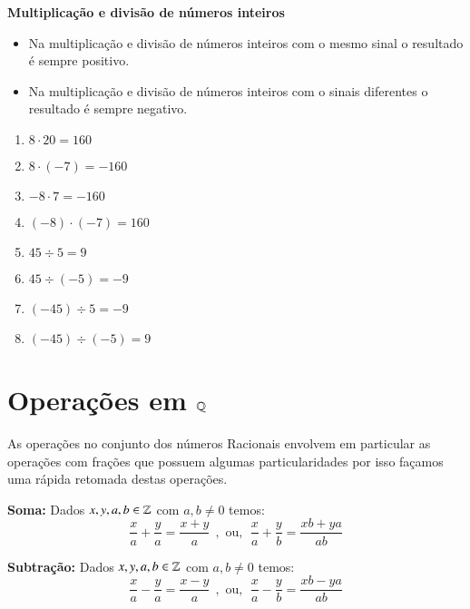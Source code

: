  \textbf{Multiplicação e divisão de números inteiros}
 
  \begin{itemize}
   \item Na multiplicação e divisão de números inteiros com o mesmo sinal o resultado é sempre positivo.
   \item Na multiplicação e divisão de números inteiros com o sinais diferentes o resultado é sempre negativo.
  \end{itemize}

  \begin{multicols}{2}
  \begin{enumerate}[1)]
   \item $8 \cdot 20= 160$
   \item $8 \cdot (-7)= -160$
   \item $-8 \cdot 7= -160$
   \item $(-8) \cdot (-7)= 160$
   \item $45 \div 5= 9$
   \item $45 \div (-5)= -9$
   \item $(-45) \div 5= -9$
   \item $(-45) \div (-5)= 9$
  \end{enumerate}
  \end{multicols}


 
 \section{Operações em \texorpdfstring{$\mathbb{Q}$}{Q}}
 
 As operações no conjunto dos números Racionais envolvem em particular as operações com frações que possuem algumas particularidades por isso façamos uma rápida retomada destas operações.
 
 \vskip0.3cm
 
 \colorbox{azul}{
 \begin{minipage}{14.5cm}
 \begin{center}
  \textbf{Soma:} Dados $x, y, a, b \in \mathbb{Z}$ com $a, b \neq 0$ temos:
 \[\frac{x}{a} + \frac{y}{a}= \frac{x+y}{a} \ \ , \text{ ou}, \ \ 
  \frac{x}{a} + \frac{y}{b}= \frac{xb + ya}{ab} \]
 \end{center}
 \end{minipage}}
 
 \vskip0.3cm
  
 \colorbox{azul}{
 \begin{minipage}{14.5cm}
 \begin{center}
  \textbf{Subtração:} Dados $x, y, a, b \in \mathbb{Z}$ com $a, b \neq 0$ temos:
 \[\frac{x}{a} - \frac{y}{a}= \frac{x-y}{a} \ \ , \text{ ou}, \ \
 \frac{x}{a} - \frac{y}{b}= \frac{xb - ya}{ab} \]
 \end{center}
 \end{minipage}}
 
